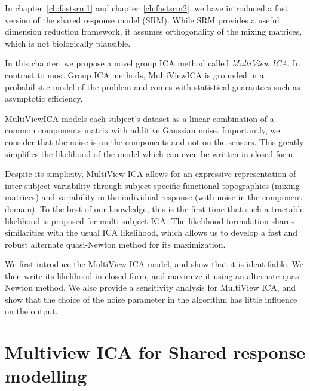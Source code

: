 In chapter~\ref{ch:fastsrm1} and chapter~\ref{ch:fastsrm2}, we have
introduced a fast version of the shared response model (SRM). While
SRM provides a useful dimension reduction framework, it assumes
orthogonality of the mixing matrices, which is not biologically
plausible.

In this chapter, we propose a novel group ICA method called \emph{MultiView ICA}.
In contrast to most Group ICA methods, MultiViewICA is grounded in a
probabilistic model of the problem and comes with statistical guarantees such as
asymptotic efficiency.

MultiViewICA models each subject's dataset as a linear combination of a common
components matrix with additive Gaussian noise.
% 
Importantly, we consider that the noise is on the components and not on
the sensors.
% 
This greatly simplifies the likelihood of the model which can even be
written in closed-form.

Despite its simplicity, MultiView ICA allows for an expressive representation of inter-subject variability through subject-specific functional topographies (mixing matrices) and variability in the individual response (with noise in the component domain).
% 
To the best of our knowledge, this is the first time that such a tractable likelihood is proposed for multi-subject ICA.
% 
The likelihood formulation shares similarities with the usual ICA likelihood, which allows us to develop a fast and robust alternate quasi-Newton method for its maximization.

We first introduce the MultiView ICA model, and show that it is identifiable. We then write its likelihood in closed form, and maximize it using an alternate quasi-Newton method.
%
We also provide a sensitivity analysis for MultiView ICA, and show that the choice of the noise parameter in the algorithm has little influence on the output.
\section{Multiview ICA for Shared response modelling}
\label{sec:mvica}
